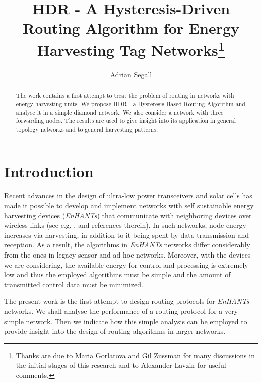 \documentclass[12 pt]{article}
\newcommand{\debug}[1]{\mbox{\tt #1}}
\renewcommand{\debug}[1]{}              \newcommand{\cmd}[1]{}
\newcommand{\msec}[2]{\renewcommand{\sname}{}\section[#1
	\debug{\fbox {#2}}]{#1 \cmd{msec} \dlabelx{#2}}\markboth{\today}{Sec. \thesection}}
\begin{document}
\clearpage
\thispagestyle{empty}

\title{
HDR - A Hysteresis-Driven Routing Algorithm for Energy Harvesting Tag Networks\footnote{Thanks are due to Maria Gorlatova and Gil Zussman for many discussions in the initial stages of this research and to Alexander Lavzin for useful comments.} \\
}
\author{Adrian Segall}

\maketitle


\begin{abstract}
The work contains a first attempt to treat the problem of routing in networks with energy harvesting units.  We propose HDR - a Hysteresis Based Routing Algorithm and analyse it in a simple diamond network.  We also consider a network with three forwarding nodes.  The results are used to give insight into its application in general topology networks and to general harvesting patterns.
\end{abstract}

\newpage
\clearpage
\tableofcontents
\clearpage
{}



\newpage

\newcommand{\fname}{consensus.tex}





\msec{Introduction}{Introduction}


Recent advances in the design of ultra-low power transceivers and solar cells has made it possible to develop and implement networks with self sustainable energy harvesting devices (\emph{EnHANTs}) that communicate with neighboring devices over wireless links (see e.g. ,  and references therein).  In such networks, node energy increases via harvesting, in addition to it being spent by data transmission and reception.  As a result, the algorithms in \emph{EnHANTs} networks differ considerably from the ones in legacy sensor and ad-hoc networks.  Moreover, with the devices we are considering, the available energy for control and processing is extremely low and thus the employed algorithms must be simple and the amount of transmitted control data must be minimized.

The present work is the first attempt to design routing protocols for \emph{EnHANTs} networks.  We shall analyse the performance of a routing protocol for a very simple network.  Then we indicate how this simple analysis can be employed to provide insight into the design of routing algorithms in larger networks.
\end{document}
